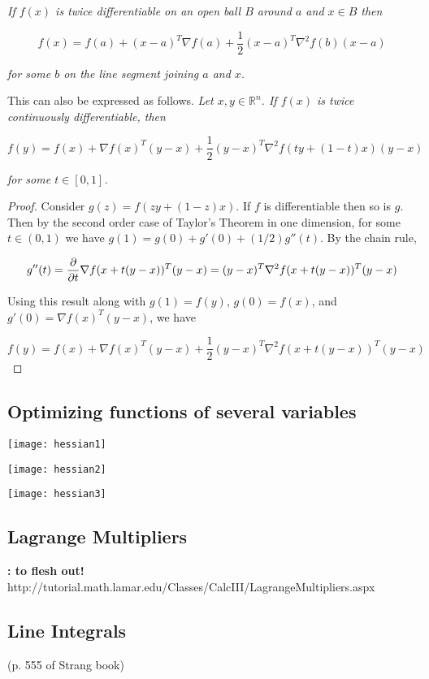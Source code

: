 \textit{If \(f(x)\) is twice differentiable on an open ball \(B\) around \(a\) and \(x \in B\) then}

\[
f(x) = f(a) + (x -a)^T \nabla f(a) + \frac{1}{2}(x-a)^T \nabla^2 f(b) (x-a)
\]

\textit{for some \(b\) on the line segment joining \(a\) and \(x\).} 

This can also be expressed as follows. \textit{Let \(x, y \in \mathbb{R}^n\). If \(f(x)\) is twice continuously differentiable, then}

\[
f(y) = f(x) +  \nabla f(x)^T (y -x) + \frac{1}{2}(y - x)^T \nabla^2 f(ty + (1-t)x) (y - x)
\]

\textit{for some \(t \in [0, 1]\).} 

\begin{proof}
Consider \(g(z) = f(zy + (1-z)x)\). If \(f\) is differentiable then so is \(g\). Then by the second order case of Taylor's Theorem in one dimension, for some \(t \in (0, 1)\) we have \(g(1) =  g(0) + g'(0) + (1/2)g''(t)\). By the chain rule,

\[
g''(t) =  \pderiv{}{t} \nabla f(x + t(y - x))^T (y - x) = (y - x)^T \nabla^2 f(x + t(y - x))^T (y - x) 
\]

Using this result along with \(g(1) = f(y)\),  \(g(0) = f(x)\), and \(g'(0) = \nabla f(x)^T (y - x) \),  we have

\[
f(y) = f(x) + \nabla f(x)^T (y - x)  + \frac{1}{2} (y - x)^T \nabla^2 f(x + t(y - x))^T (y - x) 
\]
\end{proof}

\subsection{Optimizing functions of several variables}

\texttt{[image: hessian1]}

\texttt{[image: hessian2]}

\texttt{[image: hessian3]}

\subsection{Lagrange Multipliers} \textbf{: to flesh out!} http://tutorial.math.lamar.edu/Classes/CalcIII/LagrangeMultipliers.aspx

\subsection{Line Integrals} (p. 555 of Strang book)

